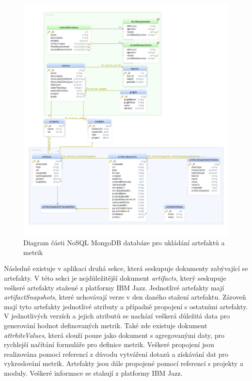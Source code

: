 \documentclass[czech,master]{diploma}
\begin{document}
\begin{figure}[!ht]
    \centering
    \includegraphics[width=1\textwidth]{Diplomka/Figures/db_diagram.png}
    \caption{Diagram části NoSQL MongoDB databáze pro ukládání artefaktů a metrik}
    \label{fig:mongo_diagram}
\end{figure}
Následně existuje v aplikaci druhá sekce, která seskupuje dokumenty zabývající se artefakty. V této sekci je nejdůležitější dokument \textit{artifacts}, který seskupuje veškeré artefakty stažené z platformy IBM Jazz. Jednotlivé artefakty mají \textit{artifactSnapshots}, které uchovávají verze v den daného stažení artefaktu. Zároveň mají tyto artefakty jednotlivé atributy a případně propojení s ostatními artefakty. V jednotlivých verzích a jejich atributů se nachází veškerá důležitá data pro generování hodnot definovaných metrik. Také zde existuje dokument \textit{attrbiteValues}, která slouží pouze jako dokument s agregovanými daty, pro rychlejší načítání formuláře pro definice metrik. Veškeré propojení jsou realizována pomocí referencí z důvodu vytváření dotazů a získávání dat pro vykreslování metrik. Artefakty jsou dále propojené pomocí referencí s projekty a moduly. Veškeré informace se stahují z platformy IBM Jazz.
\end{document}
